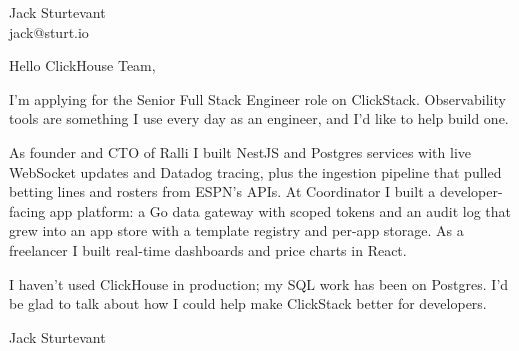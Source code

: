 \documentclass[11pt]{article}
\begin{document}
\raggedright

{\namefont\fontsize{20pt}{24pt}\selectfont Jack Sturtevant}\\[-0.3em]
jack@sturt.io

\vspace{1.2em}

Hello ClickHouse Team,

I'm applying for the Senior Full Stack Engineer role on ClickStack. Observability tools are something I use every day as an engineer, and I'd like to help build one.

As founder and CTO of Ralli I built NestJS and Postgres services with live WebSocket updates and Datadog tracing, plus the ingestion pipeline that pulled betting lines and rosters from ESPN's APIs. At Coordinator I built a developer-facing app platform: a Go data gateway with scoped tokens and an audit log that grew into an app store with a template registry and per-app storage. As a freelancer I built real-time dashboards and price charts in React.

I haven't used ClickHouse in production; my SQL work has been on Postgres. I'd be glad to talk about how I could help make ClickStack better for developers.

\vspace{0.6em}
Jack Sturtevant
\end{document}
